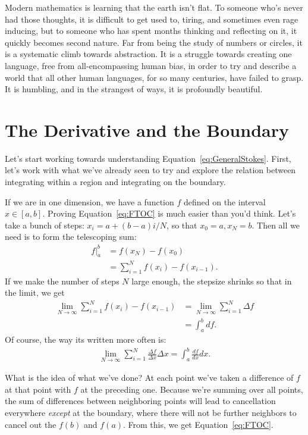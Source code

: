 \documentclass[../master.tex]{subfiles}
\begin{document}
	
	Modern mathematics is learning that the earth isn't flat. To someone who's never had those thoughts, it is difficult to get used to, tiring, and sometimes even rage inducing, but to someone who has spent months thinking and reflecting on it, it quickly becomes second nature. Far from being the study of numbers or circles, it is a systematic climb towards abstraction.  It is a struggle towards creating one language, free from all-encompassing human bias, in order to try and describe a world that all other human languages, for so many centuries, have failed to grasp. It is humbling, and in the strangest of ways, it is profoundly beautiful.



\section{The Derivative and the Boundary}

	Let's start working towards understanding Equation~\eqref{eq:GeneralStokes}. First, let's work with what we've already seen to try and explore the relation between integrating within a region and integrating on the boundary. 
	
	If we are in one dimension, we have a function $f$ defined on the interval $x \in [a,b]$. Proving Equation~\eqref{eq:FTOC} is much easier than you'd think. Let's take a bunch of steps: $x_i = a + (b-a)i/N$, so that $x_0 = a, x_N = b$. Then all we need is to form the telescoping sum:	
	\begin{align*}
		f\rvert^b_a &= f(x_N) - f(x_0) \\& = \sum_{i=1}^N f(x_{i})-f(x_{i-1}).
	\end{align*}
	If we make the number of steps $N$ large enough, the stepsize shrinks so that in the limit, we get
	\begin{align*}
		\lim_{N \rightarrow \infty} 	\sum_{i=1}^N f(x_{i})-f(x_{i-1}) & = \lim_{N \rightarrow \infty} 	\sum_{i=1}^N \Delta f \\ & = \int_a^b df.
	\end{align*}
	Of course, the way its written more often is:
	\begin{align*}
		\lim_{N \rightarrow \infty} 	\sum_{i=1}^N \frac{\Delta f}{\Delta x} \Delta x  = \int_{a}^{b} \frac{df}{dx} dx.
	\end{align*}
	
	What is the idea of what we've done? At each point we've taken a difference of $f$ at that point with $f$ at the preceding one. Because we're summing over all points, the sum of differences between neighboring points will lead to cancellation everywhere \emph{except} at the boundary, where there will not be further neighbors to cancel out the $f(b)$ and $f(a)$. From this, we get Equation~\eqref{eq:FTOC}. 
	
\end{document}
